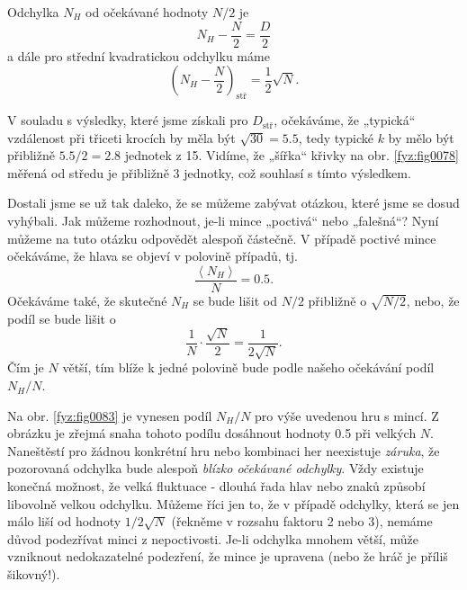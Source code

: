     Odchylka \(N_H\) od očekávané hodnoty \(N/2\) je
    \begin{equation}\label{fyz:eq081}
      N_H - \frac{N}{2} = \frac{D}{2}
    \end{equation}
    a dále pro střední kvadratickou odchylku máme
    \begin{equation}\label{fyz:eq082}
      \left(N_H - \frac{N}{2}\right)_\text{stř} = \frac{1}{2}\sqrt{N}.
    \end{equation}
    
    V souladu s výsledky, které jsme získali pro \(D_{\text{stř}}\), očekáváme, že „typická“ 
    vzdálenost při třiceti krocích by měla být \(\sqrt{30} = \num{5.5}\), tedy typické \(k\) by 
    mělo být přibližně \(\num{5.5}/2 = \num{2.8}\) jednotek z \num{15}. Vidíme, že „šířka“ křivky 
    na obr. \ref{fyz:fig0078} měřená od středu je přibližně \num{3} jednotky, což souhlasí s tímto 
    výsledkem.
    
    Dostali jsme se už tak daleko, že se můžeme zabývat otázkou, které jsme se dosud vyhýbali. Jak 
    můžeme rozhodnout, je-li mince „poctivá“ nebo „falešná“? Nyní můžeme na tuto otázku odpovědět 
    alespoň částečně. V případě poctivé mince očekáváme, že hlava se objeví v polovině případů, tj.
    \begin{equation}\label{fyz:eq083}
      \frac{\left\langle N_H\right\rangle}{N} = \num{0.5}.
    \end{equation}
    Očekáváme také, že skutečné \(N_H\) se bude lišit od \(N/2\) přibližně o \(\sqrt{N/2}\), nebo, 
    že podíl se bude lišit o
    \begin{equation}\label{fyz:eq084}
      \frac{1}{N}\cdot\frac{\sqrt{N}}{2} = \frac{1}{2\sqrt{N}}.
    \end{equation}
    Čím je \(N\) větší, tím blíže k jedné polovině bude podle našeho očekávání podíl \(N_H/N\).
    
    Na obr. \ref{fyz:fig0083} je vynesen podíl \(N_H/N\) pro výše uvedenou hru s mincí. Z obrázku je 
    zřejmá snaha tohoto podílu dosáhnout hodnoty \num{0.5} při velkých \(N\). Naneštěstí pro žádnou 
    konkrétní hru nebo kombinaci her neexistuje \emph{záruka}, že pozorovaná odchylka bude alespoň 
    \emph{blízko očekávané odchylky}. Vždy existuje konečná možnost, že velká fluktuace - dlouhá 
    řada hlav nebo znaků způsobí libovolně velkou odchylku. Můžeme říci jen to, že v případě 
    odchylky, která se jen málo liší od hodnoty \(1/2\sqrt{N}\) (řekněme v rozsahu faktoru \num{2} 
    nebo \num{3}), nemáme důvod podezřívat minci z nepoctivosti. Je-li odchylka mnohem větší, může 
    vzniknout nedokazatelné podezření, že mince je upravena (nebo že hráč je příliš šikovný!).
    
